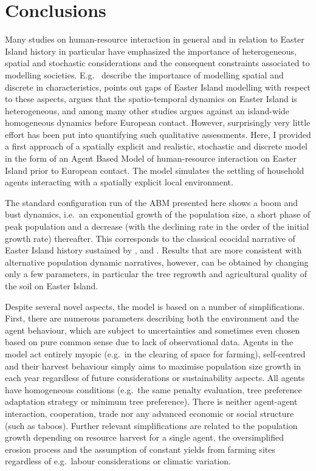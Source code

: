 
\chapter{Conclusions}

Many studies on human-resource interaction in general and in relation to Easter Island history in particular have emphasized the importance of heterogeneous, spatial and stochastic considerations and the consequent constraints associated to modelling societies.
E.g.\ \citet{Bousquet2004} describe the importance of modelling spatial and discrete in characteristics, \citet{Merico2017} points out gaps of Easter Island modelling with respect to these aspects, \citet{Rull2020} argues that the spatio-temporal dynamics on Easter Island is heterogeneous, and \citet{Stevenson2015} among many other studies argues against an island-wide homogeneous dynamics before European contact.
However, surprisingly very little effort has been put into quantifying such qualitative assessments.
Here, I provided a first approach of a spatially explicit and realistic, stochastic and discrete model in the form of an Agent Based Model of human-resource interaction on Easter Island prior to European contact. The model simulates the settling of household agents interacting with a spatially explicit local environment. 

The standard configuration run of the ABM presented here shows a boom and bust dynamics, i.e.\ an exponential growth of the population size, a short phase of peak population and a decrease (with the declining rate in the order of the initial growth rate) thereafter.
This corresponds to the classical ecocidal narrative of Easter Island history sustained by \citet{Brander1998}, \citet{Diamond2011} and \citet{Bahn2017}.
Results that are more consistent with alternative population dynamic narratives, however, can be obtained by changing only a few parameters, in particular the tree regrowth and agricultural quality of the soil on Easter Island.

Despite several novel aspects, the model is based on a number of simplifications.
First, there are numerous parameters describing both the environment and the agent behaviour, which are subject to uncertainties and sometimes even chosen based on pure common sense due to lack of observational data.
Agents in the model act entirely myopic (e.g.\ in the clearing of space for farming), self-centred and their harvest behaviour simply aims to maximise population size growth in each year regardless of future considerations or sustainability aspects. 
All agents have homogeneous conditions (e.g.\ the same penalty evaluation, tree preference adaptation strategy or minimum tree preference).
There is neither agent-agent interaction, cooperation, trade nor any advanced economic or social structure (such as taboos). 
Further relevant simplifications are related to the population growth depending on resource harvest for a single agent, the oversimplified erosion process and the assumption of constant yields from farming sites regardless of e.g.\ labour considerations or climatic variation.

